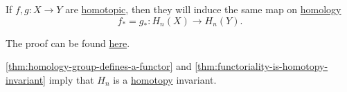 \begin{theorem}\label{thm:functoriality-is-homotopy-invariant}
	If $f, g\colon X \to Y$ are \hyperref[def:homotopic]{homotopic}, then they will induce the same map on \hyperref[def:homology-group]{homology}
	\[
		f_\ast = g_\ast : H_n(X) \to H_n(Y).
	\]
\end{theorem}
The proof can be found \hyperref[pf:functoriality-is-homotopy-invariant]{here}.
\begin{exercise}
	\autoref{thm:homology-group-defines-a-functor} and \autoref{thm:functoriality-is-homotopy-invariant} imply that \(H_{n} \) is a \hyperref[def:homotopy]{homotopy} invariant.
\end{exercise}